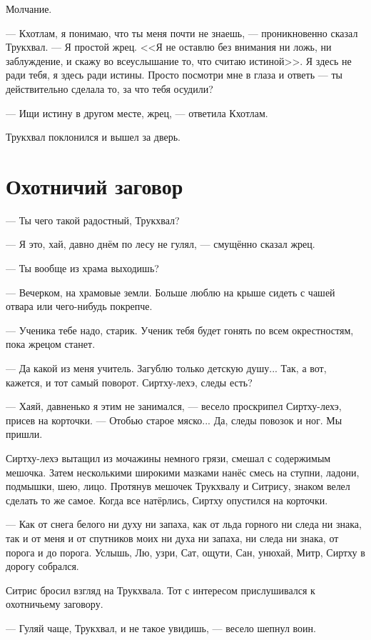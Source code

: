 Молчание.

--- Кхотлам, я понимаю, что ты меня почти не знаешь, --- проникновенно сказал Трукхвал.
--- Я простой жрец.
<<Я не оставлю без внимания ни ложь, ни заблуждение, и скажу во всеуслышание то, что считаю истиной>>.
Я здесь не ради тебя, я здесь ради истины.
Просто посмотри мне в глаза и ответь --- ты действительно сделала то, за что тебя осудили?

--- Ищи истину в другом месте, жрец, --- ответила Кхотлам.

Трукхвал поклонился и вышел за дверь.

\section{Охотничий заговор}

--- Ты чего такой радостный, Трукхвал?

--- Я это, хай, давно днём по лесу не гулял, --- смущённо сказал жрец.

--- Ты вообще из храма выходишь?

--- Вечерком, на храмовые земли.
Больше люблю на крыше сидеть с чашей отвара или чего-нибудь покрепче.

--- Ученика тебе надо, старик.
Ученик тебя будет гонять по всем окрестностям, пока жрецом станет.

--- Да какой из меня учитель.
Загублю только детскую душу...
Так, а вот, кажется, и тот самый поворот.
Сиртху-лехэ, следы есть?

--- Хаяй, давненько я этим не занимался, --- весело проскрипел Сиртху-лехэ, присев на корточки.
--- Отобью старое мяско...
Да, следы повозок и ног.
Мы пришли.

Сиртху-лехэ вытащил из мочажины немного грязи, смешал с содержимым мешочка.
Затем несколькими широкими мазками нанёс смесь на ступни, ладони, подмышки, шею, лицо.
Протянув мешочек Трукхвалу и Ситрису, знаком велел сделать то же самое.
Когда все натёрлись, Сиртху опустился на корточки.

--- Как от снега белого ни духу ни запаха, как от льда горного ни следа ни знака, так и от меня и от спутников моих ни духа ни запаха, ни следа ни знака, от порога и до порога.
Услышь, Лю, узри, Сат, ощути, Сан, унюхай, Митр, Сиртху в дорогу собрался.

Ситрис бросил взгляд на Трукхвала.
Тот с интересом прислушивался к охотничьему заговору.

--- Гуляй чаще, Трукхвал, и не такое увидишь, --- весело шепнул воин.

